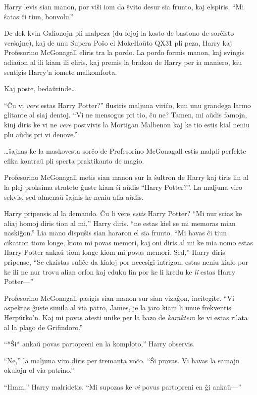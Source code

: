 Harry levis sian manon, por viŝi iom da ŝvito desur sia frunto, kaj
elspiris. ``Mi ŝatas ĉi tiun, bonvolu.''

De dek kvin Galionojn pli malpeza (du fojoj la kosto de bastono de
sorĉisto verŝajne), kaj de unu Supera Poŝo el MokeHaŭto QX31 pli peza,
Harry kaj Profesorino McGonagall eliris tra la pordo. La pordo formis
manon, kaj svingis adiaŭon al ili kiam ili eliris, kaj premis la brakon
de Harry per ia maniero, kiu sentigis Harry'n iomete malkomforta.

Kaj poste, bedaŭrinde\ldots

``Ĉu vi \emph{vere} estas Harry Potter?'' flustris maljuna viriĉo, kun
unu grandega larmo glitante al siaj dentoj. ``Vi ne mensogus pri tio,
ĉu ne?  Tamen, mi aŭdis famojn, kiuj diris ke vi ne \emph{vere}
postvivis la Mortigan Malbenon kaj ke tio estis kial neniu plu aŭdis
pri vi denove.''

\ldots ŝajnas ke la maskovesta sorĉo de Profesorino McGonagall estis
malpli perfekte efika kontraŭ pli sperta praktikanto de magio.

Profesorino McGonagall metis sian manon sur la ŝultron de Harry kaj
tiris lin al la plej proksima strateto ĝuste kiam ŝi aŭdis ``Harry
Potter?''. La maljuna viro sekvis, sed almenaŭ ŝajnis ke neniu alia
aŭdis.

Harry pripensis al la demando. Ĉu li vere \emph{estis} Harry Potter?
``Mi nur scias ke aliaj homoj diris tion al mi,'' Harry diris. ``ne
estas kiel se mi memoras mian naskiĝon.'' Lia mano dispuŝis sian
hararon el sia frunto. ``Mi havas ĉi tiun cikatron tiom longe, kiom mi
povas memori, kaj oni diris al mi ke mia nomo estas Harry Potter ankaŭ
tiom longe kiom mi povas memori. Sed,'' Harry diris pripense, ``Se
ekzistas sufiĉe da kialoj por necesigi intrigon, estas neniu kialo por
ke ili ne nur trovu alian orfon kaj eduku lin por ke li kredu ke
\emph{li} estas Harry Potter—''

Profesorino McGonagall pasigis sian manon sur sian vizaĝon,
incitegite. ``Vi aspektas ĝuste simila al via patro, James, je la jaro
kiam li unue frekventis Herpŭrko'n. Kaj mi povas atesti unike per la
bazo de \emph{karaktero} ke vi estas rilata al la plago de
Grifindoro.''

``*Ŝi* ankaŭ povas partopreni en la komploto,'' Harry observis.

``Ne,'' la maljuna viro diris per tremanta voĉo. ``Ŝi pravas. Vi havas
la samajn okulojn ol via patrino.''

``Hmm,'' Harry malridetis. ``Mi supozas ke \emph{vi} povus partopreni en ĝi
ankaŭ—''

